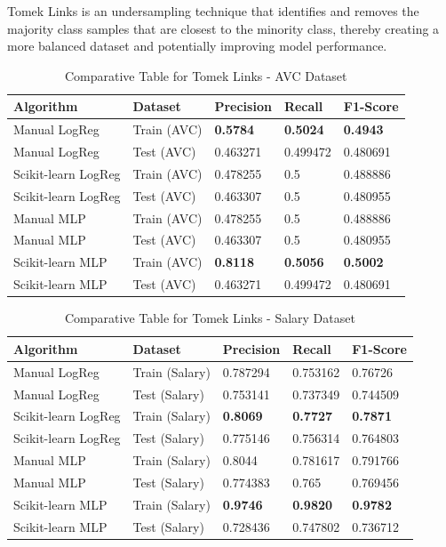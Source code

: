 \documentclass[a4paper,12pt]{article}
\begin{document}
Tomek Links is an undersampling technique that identifies and removes the majority class samples that are closest to the minority class, thereby creating a more balanced dataset and potentially improving model performance.

\begin{table}[h!]
    \centering
    \caption{Comparative Table for Tomek Links - AVC Dataset}
    \begin{tabularx}{\textwidth}{|l|l|X|X|X|}
    \hline
    \textbf{Algorithm} & \textbf{Dataset} & \textbf{Precision} & \textbf{Recall} & \textbf{F1-Score} \\
    \hline
    Manual LogReg & Train (AVC) & \textbf{0.5784} & \textbf{0.5024} & \textbf{0.4943} \\
    Manual LogReg & Test (AVC) & 0.463271 & 0.499472 & 0.480691 \\
    Scikit-learn LogReg & Train (AVC) & 0.478255 & 0.5 & 0.488886 \\
    Scikit-learn LogReg & Test (AVC) & 0.463307 & 0.5 & 0.480955 \\
    Manual MLP & Train (AVC) & 0.478255 & 0.5 & 0.488886 \\
    Manual MLP & Test (AVC) & 0.463307 & 0.5 & 0.480955 \\
    Scikit-learn MLP & Train (AVC) & \textbf{0.8118} & \textbf{0.5056} & \textbf{0.5002} \\
    Scikit-learn MLP & Test (AVC) & 0.463271 & 0.499472 & 0.480691 \\
    \hline
    \end{tabularx}
\end{table}

\begin{table}[h!]
    \centering
    \caption{Comparative Table for Tomek Links - Salary Dataset}
    \begin{tabularx}{\textwidth}{|l|l|X|X|X|}
    \hline
    \textbf{Algorithm} & \textbf{Dataset} & \textbf{Precision} & \textbf{Recall} & \textbf{F1-Score} \\
    \hline
    Manual LogReg & Train (Salary) & 0.787294 & 0.753162 & 0.76726 \\
    Manual LogReg & Test (Salary) & 0.753141 & 0.737349 & 0.744509 \\
    Scikit-learn LogReg & Train (Salary) & \textbf{0.8069} & \textbf{0.7727} & \textbf{0.7871} \\
    Scikit-learn LogReg & Test (Salary) & 0.775146 & 0.756314 & 0.764803 \\
    Manual MLP & Train (Salary) & 0.8044 & 0.781617 & 0.791766 \\
    Manual MLP & Test (Salary) & 0.774383 & 0.765 & 0.769456 \\
    Scikit-learn MLP & Train (Salary) & \textbf{0.9746} & \textbf{0.9820} & \textbf{0.9782} \\
    Scikit-learn MLP & Test (Salary) & 0.728436 & 0.747802 & 0.736712 \\
    \hline
    \end{tabularx}
\end{table}
\end{document}
